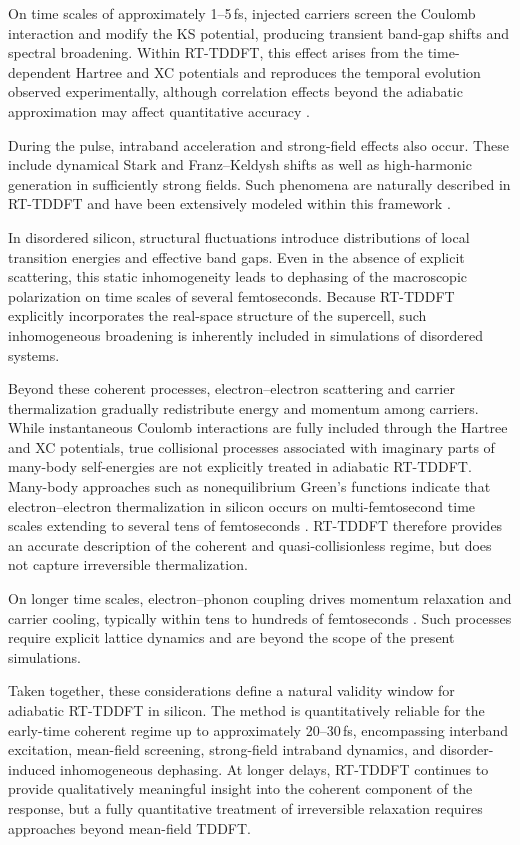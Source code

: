 On time scales of approximately 1–5\,fs, injected carriers screen the Coulomb interaction and modify the KS potential, producing transient band-gap shifts and spectral broadening. Within RT-TDDFT, this effect arises from the time-dependent Hartree and XC potentials and reproduces the temporal evolution observed experimentally, although correlation effects beyond the adiabatic approximation may affect quantitative accuracy \cite{Schultze2014Si,Botti2007}.

During the pulse, intraband acceleration and strong-field effects also occur. These include dynamical Stark and Franz--Keldysh shifts as well as high-harmonic generation in sufficiently strong fields. Such phenomena are naturally described in RT-TDDFT and have been extensively modeled within this framework \cite{Yabana2012,Uemoto2019,Sato2025review}.

In disordered silicon, structural fluctuations introduce distributions of local transition energies and effective band gaps. Even in the absence of explicit scattering, this static inhomogeneity leads to dephasing of the macroscopic polarization on time scales of several femtoseconds. Because RT-TDDFT explicitly incorporates the real-space structure of the supercell, such inhomogeneous broadening is inherently included in simulations of disordered systems.

Beyond these coherent processes, electron–electron scattering and carrier thermalization gradually redistribute energy and momentum among carriers. While instantaneous Coulomb interactions are fully included through the Hartree and XC potentials, true collisional processes associated with imaginary parts of many-body self-energies are not explicitly treated in adiabatic RT-TDDFT. Many-body approaches such as nonequilibrium Green’s functions indicate that electron–electron thermalization in silicon occurs on multi-femtosecond time scales extending to several tens of femtoseconds \cite{Marini2013,Sangalli2015,Sjakste2025UltrafastDO,Bernardi2014}. RT-TDDFT therefore provides an accurate description of the coherent and quasi-collisionless regime, but does not capture irreversible thermalization.

On longer time scales, electron–phonon coupling drives momentum relaxation and carrier cooling, typically within tens to hundreds of femtoseconds \cite{Bernardi2014, Cushing_2018,Worle2021,PhysRevB.100.035201}. Such processes require explicit lattice dynamics and are beyond the scope of the present simulations.

Taken together, these considerations define a natural validity window for adiabatic RT-TDDFT in silicon. The method is quantitatively reliable for the early-time coherent regime up to approximately 20–30\,fs, encompassing interband excitation, mean-field screening, strong-field intraband dynamics, and disorder-induced inhomogeneous dephasing. At longer delays, RT-TDDFT continues to provide qualitatively meaningful insight into the coherent component of the response, but a fully quantitative treatment of irreversible relaxation requires approaches beyond mean-field TDDFT.

